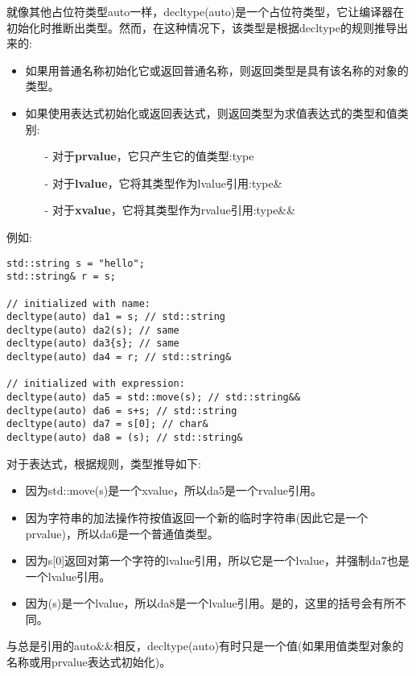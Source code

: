 就像其他占位符类型auto一样，decltype(auto)是一个占位符类型，它让编译器在初始化时推断出类型。然而，在这种情况下，该类型是根据decltype的规则推导出来的:\par

\begin{itemize}
	\item 如果用普通名称初始化它或返回普通名称，则返回类型是具有该名称的对象的类型。
	\item 如果使用表达式初始化或返回表达式，则返回类型为求值表达式的类型和值类别:
	\begin{itemize}
		\item[-] 对于\textbf{prvalue}，它只产生它的值类型:type
		\item[-] 对于\textbf{lvalue}，它将其类型作为lvalue引用:type\&
		\item[-] 对于\textbf{xvalue}，它将其类型作为rvalue引用:type\&\&
	\end{itemize}
\end{itemize}

例如:\par

\begin{lstlisting}[caption={}]
std::string s = "hello";
std::string& r = s;

// initialized with name:
decltype(auto) da1 = s; // std::string
decltype(auto) da2(s); // same
decltype(auto) da3{s}; // same
decltype(auto) da4 = r; // std::string&

// initialized with expression:
decltype(auto) da5 = std::move(s); // std::string&&
decltype(auto) da6 = s+s; // std::string
decltype(auto) da7 = s[0]; // char&
decltype(auto) da8 = (s); // std::string&
\end{lstlisting}

对于表达式，根据规则，类型推导如下:\par

\begin{itemize}
	\item 因为std::move(s)是一个xvalue，所以da5是一个rvalue引用。
	\item 因为字符串的加法操作符按值返回一个新的临时字符串(因此它是一个prvalue)，所以da6是一个普通值类型。
	\item 因为s[0]返回对第一个字符的lvalue引用，所以它是一个lvalue，并强制da7也是一个lvalue引用。
	\item 因为(s)是一个lvalue，所以da8是一个lvalue引用。是的，这里的括号会有所不同。
\end{itemize}

与总是引用的auto\&\&相反，decltype(auto)有时只是一个值(如果用值类型对象的名称或用prvalue表达式初始化)。\par

